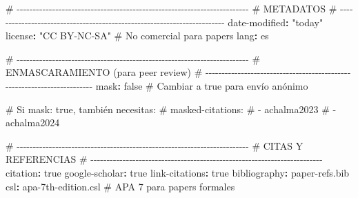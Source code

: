 \documentclass[
  doc,
  floatsintext,
  longtable,
  a4paper,
  nolmodern,
  notxfonts,
  notimes,
  12pt,
  colorlinks=true,linkcolor=blue,citecolor=blue,urlcolor=blue]{apa7}
\newenvironment{Shaded}{\begin{snugshade}}{\end{snugshade}}
\newcommand{\AttributeTok}[1]{\textcolor[rgb]{0.40,0.45,0.13}{#1}}
\newcommand{\CharTok}[1]{\textcolor[rgb]{0.13,0.47,0.30}{#1}}
\newcommand{\CommentTok}[1]{\textcolor[rgb]{0.37,0.37,0.37}{#1}}
\newcommand{\FunctionTok}[1]{\textcolor[rgb]{0.28,0.35,0.67}{#1}}
\newcommand{\KeywordTok}[1]{\textcolor[rgb]{0.00,0.23,0.31}{\textbf{#1}}}
\newcommand{\StringTok}[1]{\textcolor[rgb]{0.13,0.47,0.30}{#1}}
\begin{document}
\begin{Shaded}
\begin{Highlighting}[]
\CommentTok{\# {-}{-}{-}{-}{-}{-}{-}{-}{-}{-}{-}{-}{-}{-}{-}{-}{-}{-}{-}{-}{-}{-}{-}{-}{-}{-}{-}{-}{-}{-}{-}{-}{-}{-}{-}{-}{-}{-}{-}{-}{-}{-}{-}{-}{-}{-}{-}{-}{-}{-}{-}{-}{-}{-}{-}{-}{-}{-}{-}{-}{-}{-}{-}{-}{-}{-}{-}{-}{-}{-}{-}{-}}
\CommentTok{\# METADATOS}
\CommentTok{\# {-}{-}{-}{-}{-}{-}{-}{-}{-}{-}{-}{-}{-}{-}{-}{-}{-}{-}{-}{-}{-}{-}{-}{-}{-}{-}{-}{-}{-}{-}{-}{-}{-}{-}{-}{-}{-}{-}{-}{-}{-}{-}{-}{-}{-}{-}{-}{-}{-}{-}{-}{-}{-}{-}{-}{-}{-}{-}{-}{-}{-}{-}{-}{-}{-}{-}{-}{-}{-}{-}{-}{-}}
\FunctionTok{date{-}modified}\KeywordTok{:}\AttributeTok{ }\StringTok{"today"}
\FunctionTok{license}\KeywordTok{:}\AttributeTok{ }\StringTok{"CC BY{-}NC{-}SA"}\CommentTok{      \# No comercial para papers}
\FunctionTok{lang}\KeywordTok{:}\AttributeTok{ es}

\CommentTok{\# {-}{-}{-}{-}{-}{-}{-}{-}{-}{-}{-}{-}{-}{-}{-}{-}{-}{-}{-}{-}{-}{-}{-}{-}{-}{-}{-}{-}{-}{-}{-}{-}{-}{-}{-}{-}{-}{-}{-}{-}{-}{-}{-}{-}{-}{-}{-}{-}{-}{-}{-}{-}{-}{-}{-}{-}{-}{-}{-}{-}{-}{-}{-}{-}{-}{-}{-}{-}{-}{-}{-}{-}}
\CommentTok{\# ENMASCARAMIENTO (para peer review)}
\CommentTok{\# {-}{-}{-}{-}{-}{-}{-}{-}{-}{-}{-}{-}{-}{-}{-}{-}{-}{-}{-}{-}{-}{-}{-}{-}{-}{-}{-}{-}{-}{-}{-}{-}{-}{-}{-}{-}{-}{-}{-}{-}{-}{-}{-}{-}{-}{-}{-}{-}{-}{-}{-}{-}{-}{-}{-}{-}{-}{-}{-}{-}{-}{-}{-}{-}{-}{-}{-}{-}{-}{-}{-}{-}}
\FunctionTok{mask}\KeywordTok{:}\AttributeTok{ }\CharTok{false}\CommentTok{                 \# Cambiar a true para envío anónimo}

\CommentTok{\# Si mask: true, también necesitas:}
\CommentTok{\# masked{-}citations:}
\CommentTok{\#   {-} achalma2023}
\CommentTok{\#   {-} achalma2024}

\CommentTok{\# {-}{-}{-}{-}{-}{-}{-}{-}{-}{-}{-}{-}{-}{-}{-}{-}{-}{-}{-}{-}{-}{-}{-}{-}{-}{-}{-}{-}{-}{-}{-}{-}{-}{-}{-}{-}{-}{-}{-}{-}{-}{-}{-}{-}{-}{-}{-}{-}{-}{-}{-}{-}{-}{-}{-}{-}{-}{-}{-}{-}{-}{-}{-}{-}{-}{-}{-}{-}{-}{-}{-}{-}}
\CommentTok{\# CITAS Y REFERENCIAS}
\CommentTok{\# {-}{-}{-}{-}{-}{-}{-}{-}{-}{-}{-}{-}{-}{-}{-}{-}{-}{-}{-}{-}{-}{-}{-}{-}{-}{-}{-}{-}{-}{-}{-}{-}{-}{-}{-}{-}{-}{-}{-}{-}{-}{-}{-}{-}{-}{-}{-}{-}{-}{-}{-}{-}{-}{-}{-}{-}{-}{-}{-}{-}{-}{-}{-}{-}{-}{-}{-}{-}{-}{-}{-}{-}}
\FunctionTok{citation}\KeywordTok{:}\AttributeTok{ }\CharTok{true}
\FunctionTok{google{-}scholar}\KeywordTok{:}\AttributeTok{ }\CharTok{true}
\FunctionTok{link{-}citations}\KeywordTok{:}\AttributeTok{ }\CharTok{true}
\FunctionTok{bibliography}\KeywordTok{:}\AttributeTok{ paper{-}refs.bib}
\FunctionTok{csl}\KeywordTok{:}\AttributeTok{ apa{-}7th{-}edition.csl}\CommentTok{    \# APA 7 para papers formales}


\end{Highlighting}
\end{Shaded}
\end{document}
